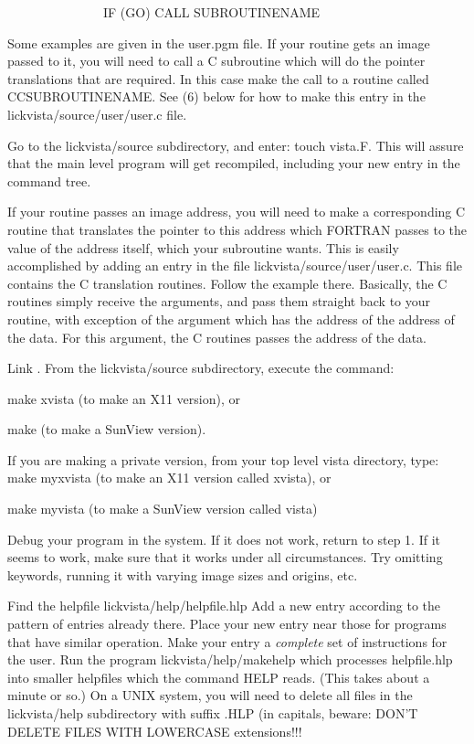 	\ \ \ \ \ \ \ \ \ \ \ \ \ \ \ IF (GO) CALL SUBROUTINENAME

Some examples are given in the user.pgm file. If your routine gets an
image passed to it, you will need to call a C subroutine which will
do the pointer translations that are required. In this case make the
call to a routine called   CCSUBROUTINENAME. See (6) below for how
to make this entry in the lickvista/source/user/user.c file.

\hang
{}Go to the lickvista/source subdirectory, 
and enter:   touch vista.F.  This will assure that the main level program
will get recompiled, including your new entry in the command tree.

\hang
{}If your routine passes an image address,
you will need to make a corresponding C routine that translates the pointer
to this address which FORTRAN passes to the value of the address itself,
which your subroutine wants.  This is easily accomplished by adding
an entry in the file lickvista/source/user/user.c.  This file contains
the C translation routines. Follow the example there. Basically, the
C routines simply receive the arguments, and pass them straight back to
your routine, with exception of the argument which has the address of the
address of the data. For this argument, the C routines passes the address
of the data.

\yyskip
\hang
{}Link \Vns.  From the lickvista/source
subdirectory, execute the command:

\yyskip
	make xvista   (to make an X11 version), or

	make          (to make a SunView version).

If you are making a private version, from your top level vista directory, type:
\yyskip
	make myxvista (to make an X11 version called xvista), or

	make myvista (to make a SunView version called vista)

\hang
{}Debug your program in the \V system. 
If it does not work, return to step 1. If it seems to
work, make sure that it works under all circumstances. Try omitting
keywords, running it with varying image sizes and origins, etc. 

\hang
{}Find the helpfile lickvista/help/helpfile.hlp
Add a new entry according to the
pattern of entries already there.  Place your new entry near those for
programs that have similar operation.  Make your entry a {\it 
complete} set of instructions for the user. Run the program
lickvista/help/makehelp which processes helpfile.hlp into smaller
helpfiles which the \V command HELP reads. (This takes about a
minute or so.) On a UNIX system, you will need to delete all files in
the lickvista/help subdirectory with
suffix  .HLP (in capitals, beware: DON'T DELETE FILES WITH LOWERCASE 
extensions!!!


